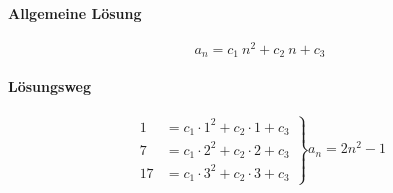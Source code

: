 \paragraph{Allgemeine Lösung}

\[
	a_n = c_1\ n^2 + c_2\ n + c_3
\]

\paragraph{Lösungsweg}

\[
	\left.
		\begin{array}{lcl}
			1 & = c_1 \cdot 1^2 + c_2 \cdot 1 + c_3 \\
			7 & = c_1 \cdot 2^2 + c_2 \cdot 2 + c_3 \\
			17 & = c_1 \cdot 3^2 + c_2 \cdot 3 + c_3
		\end{array}
	\right \}
	a_n = 2n^2 {-} 1
\]
